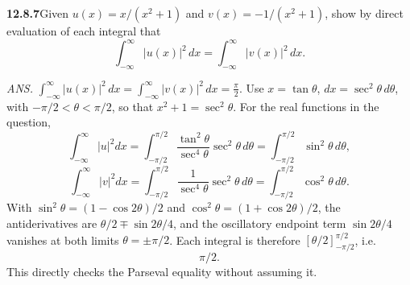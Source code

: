 \par\bigskip
\noindent\textbf{12.8.7}\quad Given $u(x)=x/(x^{2}+1)$ and
$v(x)=-1/(x^{2}+1)$, show by direct evaluation of each integral that
\[
\int_{-\infty}^{\infty}|u(x)|^{2}\,dx
=\int_{-\infty}^{\infty}|v(x)|^{2}\,dx.
\]
\par\nobreak\hfill\emph{ANS.}\enspace
$\displaystyle\int_{-\infty}^{\infty}|u(x)|^{2}\,dx
=\int_{-\infty}^{\infty}|v(x)|^{2}\,dx=\frac{\pi}{2}$.
\solution
Use $x=\tan\theta$, $dx=\sec^2\theta\,d\theta$, with
$-\pi/2<\theta<\pi/2$, so that $x^2+1=\sec^2\theta$. For the real
functions in the question,
\[
\int_{-\infty}^{\infty}|u|^2dx
=\int_{-\pi/2}^{\pi/2}
 \frac{\tan^2\theta}{\sec^4\theta}\sec^2\theta\,d\theta
=\int_{-\pi/2}^{\pi/2}\sin^2\theta\,d\theta,
\]
\[
\int_{-\infty}^{\infty}|v|^2dx
=\int_{-\pi/2}^{\pi/2}
 \frac1{\sec^4\theta}\sec^2\theta\,d\theta
=\int_{-\pi/2}^{\pi/2}\cos^2\theta\,d\theta.
\]
With $\sin^2\theta=(1-\cos2\theta)/2$ and
$\cos^2\theta=(1+\cos2\theta)/2$, the antiderivatives are
$\theta/2\mp\sin2\theta/4$, and the oscillatory endpoint term
$\sin2\theta/4$ vanishes at both limits $\theta=\pm\pi/2$. Each
integral is therefore $[\theta/2]_{-\pi/2}^{\pi/2}$, i.e.
\[
\boxed{\pi/2}.
\]
This directly checks the Parseval equality without assuming it.

